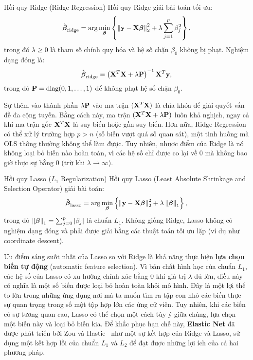 \begin{mydef}{Hồi quy Ridge (Ridge Regression)}{}
Hồi quy Ridge giải bài toán tối ưu:
\begin{equation}
    \hat{\boldsymbol{\beta}}_{\mathrm{ridge}} = \arg\min_{\boldsymbol{\beta}} \left\{ \left\lVert\mathbf{y} - \mathbf{X}\boldsymbol{\beta}\right\rVert_2^2 + \lambda \sum_{j=1}^{p}\beta_j^2 \right\},
\end{equation}
trong đó $\lambda \geq 0$ là tham số chính quy hóa và hệ số chặn $\beta_0$ không bị phạt. Nghiệm dạng đóng là:
\begin{equation}
    \hat{\boldsymbol{\beta}}_{\mathrm{ridge}} = \left(\mathbf{X}^T\mathbf{X} + \lambda\mathbf{P}\right)^{-1}\mathbf{X}^T\mathbf{y},
\end{equation}
trong đó $\mathbf{P} = \operatorname{diag}(0,1,\ldots,1)$ để không phạt hệ số chặn $\beta_0$.
\end{mydef}

Sự thêm vào thành phần $\lambda\mathbf{P}$ vào ma trận $(\mathbf{X}^T\mathbf{X})$ là chìa khóa để giải quyết vấn đề đa cộng tuyến. Bằng cách này, ma trận $(\mathbf{X}^T\mathbf{X} + \lambda\mathbf{P})$ luôn khả nghịch, ngay cả khi ma trận gốc $\mathbf{X}^T\mathbf{X}$ là suy biến hoặc gần suy biến. Hơn nữa, Ridge Regression có thể xử lý trường hợp $p > n$ (số biến vượt quá số quan sát), một tình huống mà OLS thông thường không thể làm được. Tuy nhiên, nhược điểm của Ridge là nó không loại bỏ biến nào hoàn toàn, vì các hệ số chỉ được co lại về 0 mà không bao giờ thực sự bằng 0 (trừ khi $\lambda \to \infty$).

\begin{mydef}{Hồi quy Lasso ($L_1$ Regularization)}{}
Hồi quy Lasso (Least Absolute Shrinkage and Selection Operator) giải bài toán:
\begin{equation}
    \hat{\boldsymbol{\beta}}_{\mathrm{lasso}} = \arg\min_{\boldsymbol{\beta}} \left\{ \left\lVert\mathbf{y} - \mathbf{X}\boldsymbol{\beta}\right\rVert_2^2 + \lambda \left\lVert\boldsymbol{\beta}\right\rVert_1 \right\},
\end{equation}
trong đó $\left\lVert\boldsymbol{\beta}\right\rVert_1 = \sum_{j=0}^{p} |\beta_j|$ là chuẩn $L_1$. Không giống Ridge, Lasso không có nghiệm dạng đóng và phải được giải bằng các thuật toán tối ưu lặp (ví dụ như coordinate descent).
\end{mydef}

Ưu điểm sáng suốt nhất của Lasso so với Ridge là khả năng thực hiện \textbf{lựa chọn biến tự động} (automatic feature selection). Vì bản chất hình học của chuẩn $L_1$, các hệ số của Lasso có xu hướng chính xác bằng 0 khi giá trị $\lambda$ đủ lớn, điều này có nghĩa là một số biến được loại bỏ hoàn toàn khỏi mô hình. Đây là một lợi thế to lớn trong những ứng dụng nơi mà ta muốn tìm ra tập con nhỏ các biến thực sự quan trọng trong số một tập hợp lớn các ứng cử viên. Tuy nhiên, khi các biến có sự tương quan cao, Lasso có thể chọn một cách tùy ý giữa chúng, lựa chọn một biến này và loại bỏ biến kia. Để khắc phục hạn chế này, \textbf{Elastic Net} đã được phát triển bởi Zou và Hastie~\cite{zou2005} như một sự kết hợp của Ridge và Lasso, sử dụng một kết hợp lồi của chuẩn $L_1$ và $L_2$ để đạt được những lợi ích của cả hai phương pháp.

